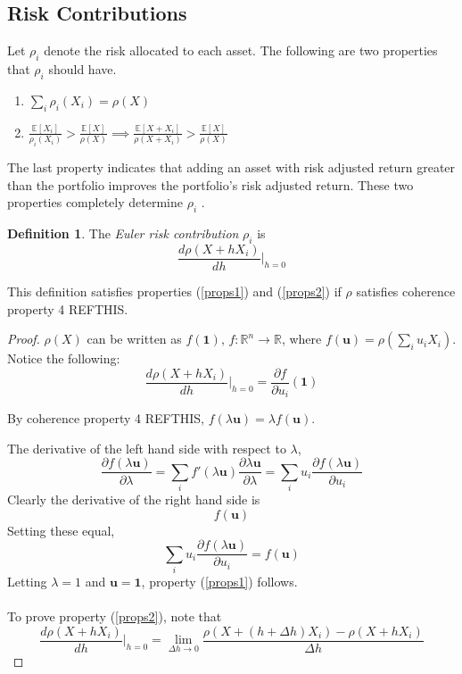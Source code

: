 \documentclass[12pt]{article}
\theoremstyle{definition}
\newtheorem{riskmeasure}{Definition}
\begin{document}
\subsection{Risk Contributions}
Let \(\rho_i\) denote the risk allocated to each asset.  The following are two properties that \(\rho_i\) should have.
\begin{enumerate} 
\item \(\sum_i \rho_i(X_i)=\rho(X)\) \label{props1}
\item \(\frac{\mathbb{E}[X_i]}{\rho_i(X_i)} >\frac{\mathbb{E}[X]}{\rho(X)} \implies \frac{\mathbb{E}[X+X_i]}{\rho(X+X_i)}>\frac{\mathbb{E}[X]}{\rho(X)}\) \label{props2}
\end{enumerate}
The last property indicates that adding an asset with risk adjusted return greater than the portfolio improves the portfolio's risk adjusted return.  These two properties completely determine \(\rho_i\) \cite{tasche2007}.

\begin{riskmeasure}
The \emph{Euler risk contribution} \(\rho_i\) is \[\frac{d\rho(X+hX_i)}{dh}\bigg|_{h=0}\]
\end{riskmeasure}

This definition satisfies properties (\ref{props1}) and (\ref{props2}) if \(\rho\) satisfies coherence property 4 REFTHIS.

\begin{proof}
\(\rho(X)\) can be written as \(f(\mathbf{1}),\, f:\mathbb{R}^n \to \mathbb{R}\), where \(f(\mathbf{u})=\rho\left(\sum_i u_i X_i\right)\).  Notice the following:
\[\frac{d\rho(X+hX_i)}{dh}\bigg|_{h=0}=\frac{\partial f} {\partial u_i}\left(\mathbf{1}\right)\]

By coherence property 4 REFTHIS, \(f\left(\lambda \mathbf{u}\right)=\lambda f\left(\mathbf{u}\right)\). 

The derivative of the left hand side with respect to \(\lambda\), 
\[\frac{\partial f(\lambda \mathbf{u})}{\partial \lambda}=\sum_i f'(\lambda \mathbf{u})\frac{\partial \lambda \mathbf{u}}{\partial \lambda}=
\sum_i u_i \frac{\partial f\left(\lambda \mathbf{u}\right)} {\partial u_i}\]
Clearly the derivative of the right hand side is
\[f(\mathbf{u})\]
Setting these equal, 
\[\sum_i u_i \frac{\partial f\left(\lambda \mathbf{u}\right)} {\partial u_i}=f(\mathbf{u})\]
Letting \(\lambda=1\) and \(\mathbf{u}=\mathbf{1}\), property (\ref{props1}) follows.
\\
\\
To prove property (\ref{props2}), note that 
\[\frac{d\rho(X+hX_i)}{dh}\bigg|_{h=0}=\lim_{\Delta h \to 0}\frac{\rho(X+(h+\Delta h)X_i)-\rho(X+hX_i)}{\Delta h} \]

\end{proof}
\end{document}
